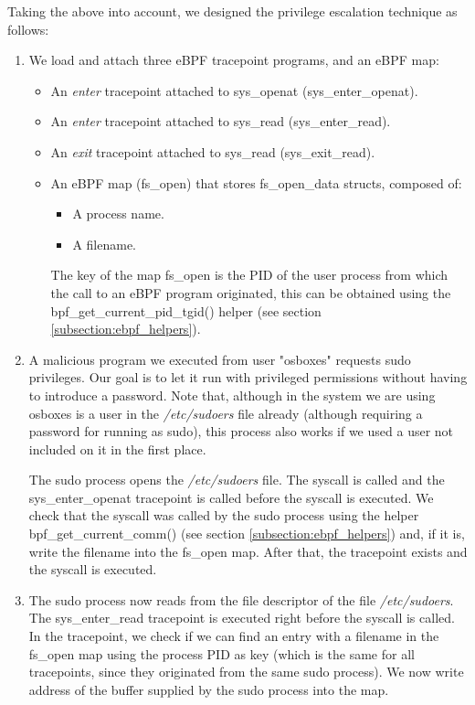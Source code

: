 Taking the above into account, we designed the privilege escalation technique as follows:
\begin{enumerate}
\item We load and attach three eBPF tracepoint programs, and an eBPF map:
\begin{itemize}
	\item An \textit{enter} tracepoint attached to sys\_openat (sys\_enter\_openat).
	\item An \textit{enter} tracepoint attached to sys\_read (sys\_enter\_read).
	\item An \textit{exit} tracepoint attached to sys\_read (sys\_exit\_read).
	\item An eBPF map (fs\_open) that stores fs\_open\_data structs, composed of:
	\begin{itemize}
	\item A process name.
	\item A filename.
	\end{itemize}
	The key of the map fs\_open is the PID of the user process from which the call to an eBPF program originated, this can be obtained using the bpf\_get\_current\_pid\_tgid() helper (see section \ref{subsection:ebpf_helpers}).
\end{itemize}
\item A malicious program we executed from user "osboxes" requests sudo privileges. Our goal is to let it run with privileged permissions without having to introduce a password. Note that, although in the system we are using osboxes is a user in the \textit{/etc/sudoers} file already (although requiring a password for running as sudo), this process also works if we used a user not included on it in the first place.

The sudo process opens the \textit{/etc/sudoers} file. The syscall is called and the sys\_enter\_openat tracepoint is called before the syscall is executed. We check that the syscall was called by the sudo process using the helper bpf\_get\_current\_comm() (see section \ref{subsection:ebpf_helpers}) and, if it is, write the filename into the fs\_open map. After that, the tracepoint exists and the syscall is executed.

\item The sudo process now reads from the file descriptor of the file \textit{/etc/sudoers}. The sys\_enter\_read tracepoint is executed right before the syscall is called. In the tracepoint, we check if we can find an entry with a filename in the fs\_open map using the process PID as key (which is the same for all tracepoints, since they originated from the same sudo process). We now write address of the buffer supplied by the sudo process into the map.


\end{enumerate}
